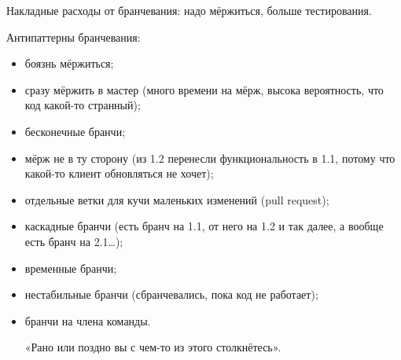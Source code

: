 \documentclass[11pt,a4paper]{article}
\begin{document}
Накладные расходы от бранчевания: надо мёржиться, больше тестирования.

Антипаттерны бранчевания:
\begin{itemize}
\item боязнь мёржиться;
\item сразу мёржить в мастер (много времени на мёрж, высока вероятность, что код какой-то странный);
\item бесконечные бранчи;
\item мёрж не в ту сторону (из 1.2 перенесли функциональность в 1.1, потому что какой-то клиент обновляться не хочет);
\item отдельные ветки для кучи маленьких изменений (pull request);
\item каскадные бранчи (есть бранч на 1.1, от него на 1.2 и так далее, а вообще есть бранч на 2.1…);
\item временные бранчи;
\item нестабильные бранчи (сбранчевались, пока код не работает);
\item бранчи на члена команды.

«Рано или поздно вы с чем-то из этого столкнётесь».
\end{itemize}
\end{document}
